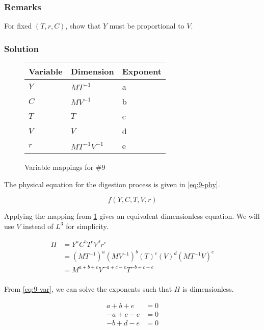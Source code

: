 \documentclass[12pt]{article}
\begin{document}
  \subsubsection*{Remarks}
  For fixed $(T,r,C)$, show that $Y$ must be proportional to $V$.

  \subsubsection*{Solution}
  \begin{figure}
    \centering
    \begin{tabularx}{0.5\textwidth}{XXX}
      Variable & Dimension & Exponent \\ \midrule
      $Y$ & $MT^{-1}$ & a \\
      $C$ & $MV^{-1}$ & b \\
      $T$ & $T$ & c \\
      $V$ & $V$ & d \\
      $r$ & $MT^{-1}V^{-1}$ & e \\
    \end{tabularx}
    \caption{Variable mappings for \#9}
\label{fig:9-var-mappings}
  \end{figure}

  The physical equation for the digestion process is given in \cref{eq:9-phy}.

  \begin{equation}
    \label{eq:9-phy}
    f(Y,C,T,V,r)
  \end{equation}

  Applying the mapping from \cref{fig:9-var-mappings} gives an equivalent
  dimensionless equation. We will use $V$ instead of $L^3$ for simplicity.

  \begin{equation}
    \label{eq:9-var}
    \begin{aligned}
      \Pi &= Y^a C^b T^c V^d r^e \\
      &= {(MT^{-1})}^a {(MV^{-1})}^b {(T)}^c {(V)}^d {(MT^{-1}V)}^e \\
      &= M^{a+b+e}V^{-a+c-e}T^{-b+c-e} \\
    \end{aligned}
  \end{equation}

  From \cref{eq:9-var}, we can solve the exponents such that $\Pi$ is
  dimensionless.

  \begin{equation}
    \label{eq:9-exp-eqs}
    \begin{aligned}
      a + b + e &= 0 \\
      -a + c - e &= 0 \\
      -b + d - e &= 0 \\
    \end{aligned}
  \end{equation}
\end{document}
